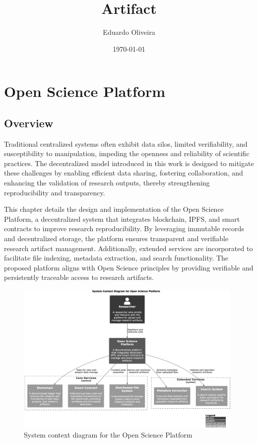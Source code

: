 \documentclass{article}
\title{Artifact}
\author{Eduardo Oliveira}
\date{\today}
\begin{document}
\maketitle

\section{Open Science Platform}

\subsection{Overview}

Traditional centralized systems often exhibit data silos, limited verifiability, and susceptibility to manipulation, impeding the openness and reliability of scientific practices. The decentralized model introduced in this work is designed to mitigate these challenges by enabling efficient data sharing, fostering collaboration, and enhancing the validation of research outputs, thereby strengthening reproducibility and transparency.

This chapter details the design and implementation of the Open Science Platform, a decentralized system that integrates blockchain, IPFS, and smart contracts to improve research reproducibility. By leveraging immutable records and decentralized storage, the platform ensures transparent and verifiable research artifact management. Additionally, extended services are incorporated to facilitate file indexing, metadata extraction, and search functionality. The proposed platform aligns with Open Science principles by providing verifiable and persistently traceable access to research artifacts.


\begin{figure}[htbp]
    \centering
    \includegraphics[width=0.98\textwidth, keepaspectratio]{c4_context_diagram}
    \caption{System context diagram for the Open Science Platform}
    \label{fig:c4_context_diagram}
\end{figure}
\end{document}
